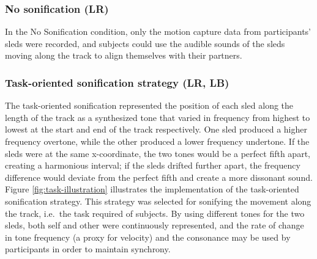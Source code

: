 \documentclass[10pt,a4paper,onecolumn]{article}
\begin{document}
\hypertarget{no-sonification-lr}{%
\subsubsection{No sonification (LR)}\label{no-sonification-lr}}

In the No Sonification condition, only the motion capture data from participants' sleds were recorded, and subjects could use the audible sounds of the sleds moving along the track to align themselves with their partners.

\hypertarget{task-oriented-sonification-strategy-lr-lb}{%
\subsubsection{Task-oriented sonification strategy (LR, LB)}\label{task-oriented-sonification-strategy-lr-lb}}

The task-oriented sonification represented the position of each sled along the length of the track as a synthesized tone that varied in frequency from highest to lowest at the start and end of the track respectively. One sled produced a higher frequency overtone, while the other produced a lower frequency undertone. If the sleds were at the same x-coordinate, the two tones would be a perfect fifth apart, creating a harmonious interval; if the sleds drifted further apart, the frequency difference would deviate from the perfect fifth and create a more dissonant sound. Figure \ref{fig:task-illustration} illustrates the implementation of the task-oriented sonification strategy. This strategy was selected for sonifying the movement along the track, i.e.~the task required of subjects. By using different tones for the two sleds, both self and other were continuously represented, and the rate of change in tone frequency (a proxy for velocity) and the consonance may be used by participants in order to maintain synchrony.
\end{document}
